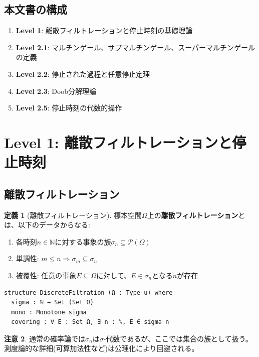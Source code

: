 \documentclass[a4paper,12pt]{ltjsarticle}
\theoremstyle{definition}
\newtheorem{definition}{定義}[section]
\newtheorem{remark}[definition]{注意}
\begin{document}
\subsection{本文書の構成}

\begin{enumerate}
  \item \textbf{Level 1}: 離散フィルトレーションと停止時刻の基礎理論
  \item \textbf{Level 2.1}: マルチンゲール、サブマルチンゲール、スーパーマルチンゲールの定義
  \item \textbf{Level 2.2}: 停止された過程と任意停止定理
  \item \textbf{Level 2.3}: Doob分解理論
  \item \textbf{Level 2.5}: 停止時刻の代数的操作
\end{enumerate}

\section{Level 1: 離散フィルトレーションと停止時刻}

\subsection{離散フィルトレーション}

\begin{definition}[離散フィルトレーション]
標本空間$\Omega$上の\textbf{離散フィルトレーション}とは、以下のデータからなる:
\begin{enumerate}
  \item 各時刻$n \in \mathbb{N}$に対する事象の族$\sigma_n \subseteq \mathcal{P}(\Omega)$
  \item 単調性: $m \leq n \Rightarrow \sigma_m \subseteq \sigma_n$
  \item 被覆性: 任意の事象$E \subseteq \Omega$に対して、$E \in \sigma_n$となる$n$が存在
\end{enumerate}
\end{definition}

\begin{leanbox}
\begin{verbatim}
structure DiscreteFiltration (Ω : Type u) where
  sigma : ℕ → Set (Set Ω)
  mono : Monotone sigma
  covering : ∀ E : Set Ω, ∃ n : ℕ, E ∈ sigma n
\end{verbatim}
\end{leanbox}

\begin{remark}
通常の確率論では$\sigma_n$は$\sigma$-代数であるが、ここでは集合の族として扱う。測度論的な詳細(可算加法性など)は公理化により回避される。
\end{remark}
\end{document}

